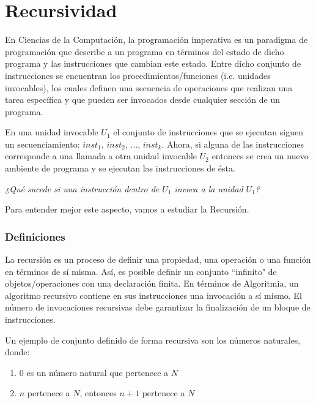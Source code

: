 \newpage
\part{Recursividad}
\setcounter{section}{0}

En Ciencias de la Computación, la programación imperativa es un paradigma de programación que describe a un programa en términos del estado de dicho programa y las instrucciones que cambian este estado. Entre dicho conjunto de instrucciones se encuentran los procedimientos/funciones (i.e. unidades invocables), los cuales definen una secuencia de operaciones que realizan una tarea específica y que pueden ser invocados desde cualquier sección de un programa.

En una unidad invocable $U_1$ el conjunto de instrucciones que se ejecutan siguen un secuenciamiento: $inst_1$, $inst_2$, ..., $inst_k$. Ahora, si alguna de las instrucciones corresponde a una llamada a otra unidad invocable $U_2$ entonces se crea un nuevo ambiente de programa y se ejecutan las instrucciones de ésta.

\begin{center}
	\textit{¿Qué sucede si una instrucción dentro de $U_1$ invoca a la unidad $U_1$?}
\end{center}

Para entender mejor este aspecto, vamos a estudiar la Recursión.


\section{Definiciones} \label{lb:recursi}

La recursión es un proceso de definir una propiedad, una operación o una función en términos de sí misma. Así, es posible definir un conjunto ``infinito" de objetos/operaciones con una declaración finita. En términos de Algoritmia, un algoritmo recursivo contiene en sus instrucciones una invocación a sí mismo. El número de invocaciones recursivas debe garantizar la finalización de un bloque de instrucciones.

Un ejemplo de conjunto definido de forma recursiva son los números naturales, donde:
\begin{enumerate}
\item $0$ es un número natural que pertenece a $N$
\item $n$ pertenece a $N$, entonces $n+1$ pertenece a $N$
\end{enumerate}


